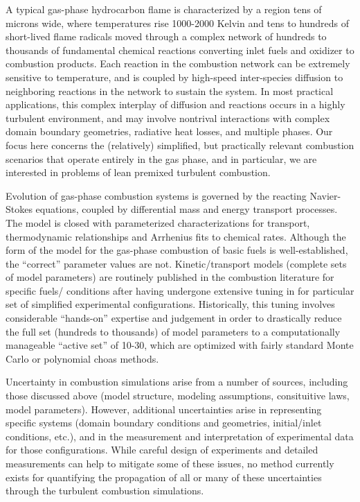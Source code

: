 \documentclass[11pt]{article}
\begin{document}
A typical gas-phase hydrocarbon flame is characterized by a region
tens of microns wide, where temperatures rise 1000-2000 Kelvin and
tens to hundreds of short-lived flame radicals moved through a complex
network of hundreds to thousands of fundamental chemical reactions
converting inlet fuels and oxidizer to combustion products.  Each
reaction in the combustion network can be extremely sensitive to
temperature, and is coupled by high-speed inter-species diffusion to
neighboring reactions in the network to sustain the system.  In most
practical applications, this complex interplay of diffusion and
reactions occurs in a highly turbulent environment, and may involve
nontrival interactions with complex domain boundary geometries,
radiative heat losses, and multiple phases.  Our focus here concerns
the (relatively) simplified, but practically relevant combustion
scenarios that operate entirely in the gas phase, and in particular,
we are interested in problems of lean premixed turbulent combustion.

Evolution of gas-phase combustion systems is governed by the reacting
Navier-Stokes equations, coupled by
differential mass and energy transport processes.  The model is 
closed with
parameterized characterizations for transport, thermodynamic
relationships and Arrhenius fits to chemical rates.
Although the form of the model for the gas-phase combustion of basic
fuels is well-established, the ``correct'' parameter values are not.
Kinetic\slash transport models (complete sets of model parameters) are routinely
published in the combustion literature for specific fuels\slash
conditions after having undergone extensive tuning in
for particular set of
simplified experimental configurations.  Historically, this tuning involves 
considerable ``hands-on'' expertise and judgement in
order to drastically reduce the full set (hundreds to thousands) of
model parameters to a computationally manageable ``active set'' of
10-30, which are optimized with fairly standard Monte Carlo or
polynomial choas methods.

Uncertainty in combustion simulations arise from a number of sources,
including those discussed above (model structure, modeling
assumptions, consituitive laws, model parameters).  However,
additional uncertainties arise in representing specific systems
(domain boundary conditions and geometries, initial\slash inlet
conditions, etc.), and in the measurement and interpretation of
experimental data for those configurations.  While careful design of
experiments and detailed measurements can help to mitigate some of
these issues, no method currently exists for quantifying the
propagation of all or many of these uncertainties through the
turbulent combustion simulations.
\end{document}
